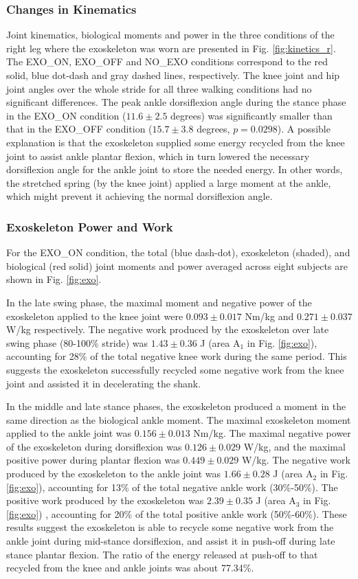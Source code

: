 \documentclass[twocolumn,cleanfoot,10pt]{asme2ej}
\begin{document}
\subsubsection{Changes in Kinematics}
Joint kinematics, biological moments and power in the three conditions of the right leg where the exoskeleton was worn are presented in Fig. \ref{fig:kinetics_r}.
The EXO\_ON, EXO\_OFF and NO\_EXO conditions correspond to the red solid, blue dot-dash and gray dashed lines, respectively.
The knee joint and hip joint angles over the whole stride for all three walking conditions had no significant differences.
The peak ankle dorsiflexion angle during the stance phase in the EXO\_ON condition ($11.6\pm2.5$ degrees) was significantly smaller than that in the EXO\_OFF condition ($15.7\pm3.8$ degrees, $p=0.0298$).
A possible explanation is that the exoskeleton supplied some energy recycled from the knee joint to assist ankle plantar flexion, which in turn lowered the necessary dorsiflexion angle for the ankle joint to store the needed energy.
In other words, the stretched spring (by the knee joint) applied a large moment at the ankle, which might prevent it achieving the normal dorsiflexion angle.

\subsubsection{Exoskeleton Power and Work}
For the EXO\_ON condition, the total (blue dash-dot), exoskeleton (shaded), and biological (red solid) joint moments and power averaged across eight subjects are shown in Fig. \ref{fig:exo}.

In the late swing phase, the maximal moment and negative power of the exoskeleton applied to the knee joint were $0.093\pm0.017$ Nm/kg and $0.271\pm0.037$ W/kg respectively.
The negative work produced by the exoskeleton over late swing phase (80-100\% stride) was $1.43\pm0.36$ J (area A$_{1}$ in Fig. \ref{fig:exo}), accounting for 28\% of the total negative knee work during the same period.
This suggests the exoskeleton successfully recycled some negative work from the knee joint and assisted it in decelerating the shank.

In the middle and late stance phases, the exoskeleton produced a moment in the same direction as the biological ankle moment.
The maximal exoskeleton moment applied to the ankle joint was $0.156\pm0.013$ Nm/kg.
The maximal negative power of the exoskeleton during dorsiflexion was $0.126\pm0.029$ W/kg, and the maximal positive power during plantar flexion was $0.449\pm0.029$ W/kg.
The negative work produced by the exoskeleton to the ankle joint was $1.66\pm0.28$ J (area A$_{2}$ in Fig. \ref{fig:exo}), accounting for 13\% of the total negative ankle work (30\%-50\%).
The positive work produced by the exoskeleton was $2.39\pm0.35$ J (area A$_{3}$ in Fig. \ref{fig:exo}) , accounting for 20\% of the total positive ankle work (50\%-60\%).
These results suggest the exoskeleton is able to recycle some negative work from the ankle joint during mid-stance dorsiflexion, and assist it in push-off during late stance plantar flexion.
The ratio of the energy released at push-off to that recycled from the knee and ankle joints was about 77.34\%.
\end{document}
